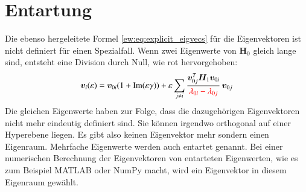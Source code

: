 \section{Entartung}

Die ebenso hergeleitete Formel \ref{ew:eq:explicit_eigvecs} für die Eigenvektoren ist nicht definiert für einen Spezialfall.
Wenn zwei Eigenwerte von $\bm H_0$ gleich lange sind, entsteht eine Division durch Null, wie rot hervorgehoben:
\begin{equation*} %
    \bm v_i(\varepsilon)
    =
    \bm v_{0i} ( 1+ \mathrm{Im}(\varepsilon \gamma)) + \varepsilon \sum_{j \neq i}
    \frac{\bm v_{0j}^T \bm H_1 \bm v_{0i}}{\RD{\lambda_{0i} - \lambda_{0j}}}
    \, \bm v_{0j}
\end{equation*}
Die gleichen Eigenwerte haben zur Folge, dass die dazugehörigen Eigenvektoren nicht mehr eindeutig definiert sind.
Sie können irgendwo orthogonal auf einer Hyperebene liegen.
Es gibt also keinen Eigenvektor mehr sondern einen Eigenraum.
Mehrfache Eigenwerte werden auch entartet genannt.
Bei einer numerischen Berechnung der Eigenvektoren von entarteten Eigenwerten, wie es zum Beispiel MATLAB oder NumPy macht, wird ein Eigenvektor in diesem Eigenraum gewählt.

